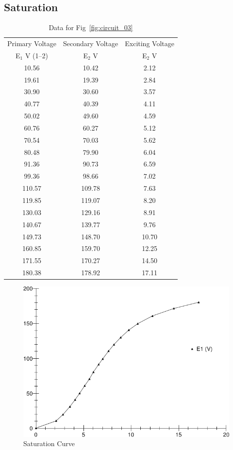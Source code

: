 \documentclass{article}
\begin{document}
\subsection{Saturation}
\begin{table}[H]
  \centering
  \begin{tabular}{ccc}
    \hline
    Primary Voltage & Secondary Voltage & Exciting Voltage\\
    E$_1$ V (1--2) & E$_2$ V & E$_2$ V\\
    \hline
    10.56 &  10.42 &  2.12 \\
    19.61 &  19.39 &  2.84 \\
    30.90 &  30.60 &  3.57 \\
    40.77 &  40.39 &  4.11 \\
    50.02 &  49.60 &  4.59 \\
    60.76 &  60.27 &  5.12 \\
    70.54 &  70.03 &  5.62 \\
    80.48 &  79.90 &  6.04 \\
    91.36 &  90.73 &  6.59 \\
    99.36 &  98.66 &  7.02 \\
    110.57 & 109.78 &  7.63 \\
    119.85 & 119.07 &  8.20 \\
    130.03 & 129.16 &  8.91 \\
    140.67 & 139.77 &  9.76 \\
    149.73 & 148.70 & 10.70 \\
    160.85 & 159.70 & 12.25 \\
    171.55 & 170.27 & 14.50 \\
    180.38 & 178.92 & 17.11 \\
  \end{tabular}
  \caption{Data for Fig~\ref{fig:circuit_03}}
  \label{tab:circuit_3}
\end{table}

\begin{figure}[H]
  \centering
  \includegraphics[width=.8\textwidth]{graph}
  \caption{Saturation Curve}
  \label{fig:graph}
\end{figure}
\end{document}
